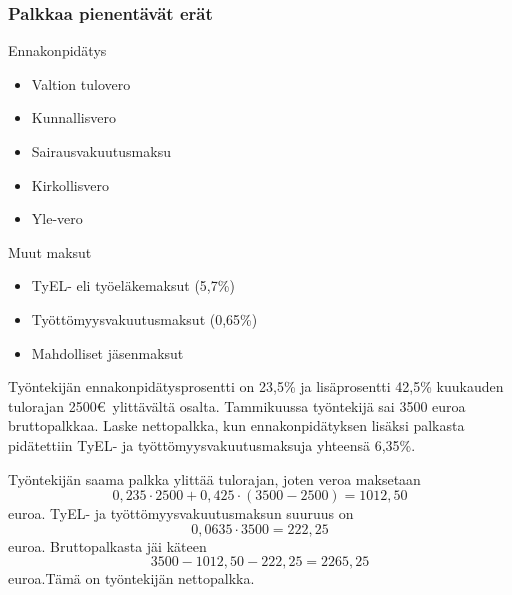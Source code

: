 \documentclass{beamer}
\begin{document}
\begin{frame}
\frametitle{Palkkaa pienentävät erät}
	\begin{block}{Ennakonpidätys}
		\begin{itemize}
			\item Valtion tulovero
			\item Kunnallisvero
			\item Sairausvakuutusmaksu
			\item Kirkollisvero
			\item Yle-vero
		\end{itemize}
	\end{block}
	\begin{block}{Muut maksut}
		\begin{itemize}
			\item TyEL- eli työeläkemaksut (5,7\%)
			\item Työttömyysvakuutusmaksut (0,65\%)
			\item Mahdolliset jäsenmaksut
		\end{itemize}
	\end{block}
\end{frame}

\begin{frame}
	\begin{esim}
		Työntekijän ennakonpidätysprosentti on 23,5\% ja lisäprosentti 42,5\% kuukauden tulorajan 2500\euro\ ylittävältä osalta. Tammikuussa työntekijä sai 3500 euroa bruttopalkkaa. Laske nettopalkka, kun ennakonpidätyksen lisäksi palkasta pidätettiin TyEL- ja työttömyysvakuutusmaksuja yhteensä 6,35\%.
	\end{esim}
\end{frame}

\begin{frame}
	\begin{ratkaisu}
		Työntekijän saama palkka ylittää tulorajan\pause , joten veroa maksetaan 
		\[
			0,235\cdot2500 + 0,425\cdot(3500-2500) = 1012,50
		\] euroa. \pause TyEL- ja työttömyysvakuutusmaksun suuruus on\pause 
		\[
			0,0635\cdot 3500 = 222,25
		\] euroa. \pause
		Bruttopalkasta jäi käteen\pause
		\[
			3500-1012,50-222,25 = 2265,25
		\]
		 euroa.\pause Tämä on työntekijän nettopalkka.
	\end{ratkaisu}
\end{frame}
\end{document}
